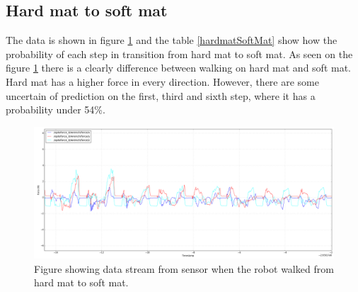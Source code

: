 \documentclass[USenglish]{ifimaster}  %
\begin{document}
\FloatBarrier

\subsection{Hard mat to soft mat} \label{sec:hmssm}
The data is shown in figure \ref{fig:hardmatSoftMat} and the table \ref{hardmatSoftMat} show how the probability of each step in transition from hard mat to soft mat. As seen on the figure \ref{fig:hardmatSoftMat} there is a clearly difference between walking on hard mat and soft mat. Hard mat has a higher force in every direction. However, there are some uncertain of prediction on the first, third and sixth step, where it has a probability under 54\%. 


\begin{figure}[h]
    \centering
    \includegraphics[width=\textwidth,height=\textheight,keepaspectratio]{Figures/MB3MM}
    \caption{Figure showing data stream from sensor when the robot walked from hard mat to soft mat.}
    \label{fig:hardmatSoftMat}
\end{figure}

\begin{table}[h]
\centering
{}
\caption{The table showing probability of each terrain per step walking from hard mat to soft mat. Marked green represent correct prediction and correct terrain, red represent wrong prediction and yellow is the correct prediction if it got wrong.}
\label{hardmatSoftMat}
\end{table}
\FloatBarrier
\end{document}
